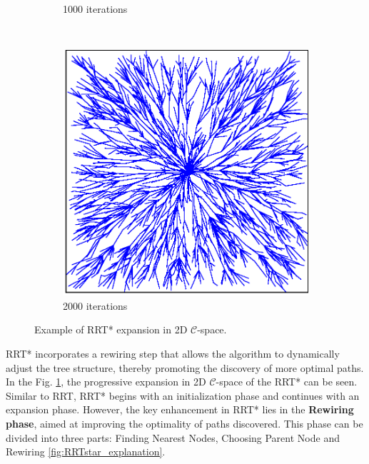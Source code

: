 \documentclass{ctuthesis}
\begin{document}
\begin{figure}[!ht]
\begin{subfigure}[b]{0.3\textwidth}
      \caption{1000 iterations}
  \end{subfigure}
  ~ %
  \begin{subfigure}[b]{0.302\textwidth}
      \includegraphics[width=\textwidth]{figChap3/RRTstar_expansion2000.eps}
      \caption{2000 iterations}
  \end{subfigure}
  \caption{Example of RRT* expansion in 2D $\mathcal{C}$-space.}
  \label{fig:RRTstargrowing}
\end{figure}
RRT* incorporates a rewiring step that allows the algorithm to dynamically adjust the tree structure, 
thereby promoting the discovery of more optimal paths.
In the Fig. \ref{fig:RRTstargrowing},
the progressive expansion in 2D $\mathcal{C}$-space of the RRT* can be seen.\\[12pt]
Similar to RRT, RRT* begins with an initialization phase and continues with an expansion phase.
However, the key enhancement in RRT* lies in the \textbf{Rewiring phase}, 
aimed at improving the optimality of paths discovered.
This phase can be divided into three parts: Finding Nearest Nodes, 
Choosing Parent Node and Rewiring \ref{fig:RRTstar_explanation}. 
\end{document}
